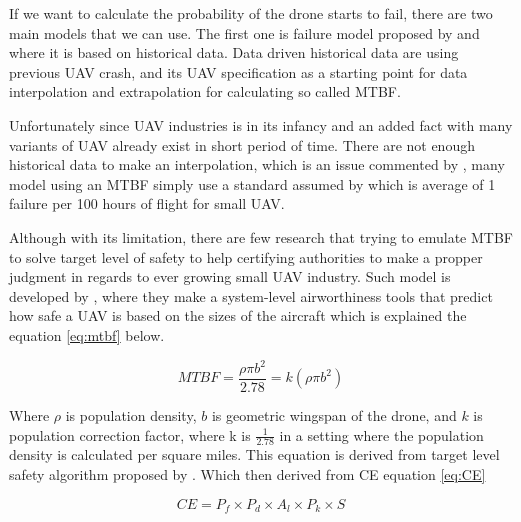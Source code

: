 \documentclass[12pt]{report}
\begin{document}
            If we want to calculate the probability of the drone starts to fail, there are two main models that we can
            use. The first one is  failure model proposed by \cite{breunig_modeling_2018} and \cite{weibel_safety_2012}
            where it is based on historical data. Data driven historical data are using previous UAV crash, and its UAV
            specification as a starting point for data interpolation and extrapolation for calculating so called
            \ac{MTBF}.

            Unfortunately since UAV industries is in its infancy and an added fact with many variants of UAV already
            exist in short period of time. There are not enough historical data to make an interpolation, which is an
            issue commented by \cite{breunig_modeling_2018}, many model using an MTBF simply use a standard assumed by
            \cite{arc_unmanned_2015} which is average of 1 failure per 100 hours of flight for small UAV.

            Although with its limitation, there are few research that trying to emulate MTBF to solve target level of
            safety to help certifying authorities to make a propper judgment in regards to ever growing small UAV
            industry. Such model is developed by \cite{burke_system-level_2011}, where they make a system-level
            airworthiness tools that predict how safe a UAV is based on the sizes of the aircraft which is explained the
            equation \ref{eq:mtbf} below.

            \begin{equation}\label{eq:mtbf}
                MTBF = \frac{\rho \pi b^2}{2.78} = k(\rho \pi b^2)
            \end{equation}

            Where \(\rho\) is population density, \(b\) is geometric wingspan of the drone, and \(k\) is population
            correction factor, where k is \(\frac{1}{2.78}\) in a setting where the population density is calculated per
            square miles. This equation is derived from target level safety algorithm proposed by
            \cite{burke_system-level_2011}. Which then derived from \ac{CE} equation \ref{eq:CE}

            \begin{equation}\label{eq:CE}
                CE = P_f \times P_d \times A_l \times P_k \times {S}
            \end{equation}
\end{document}
